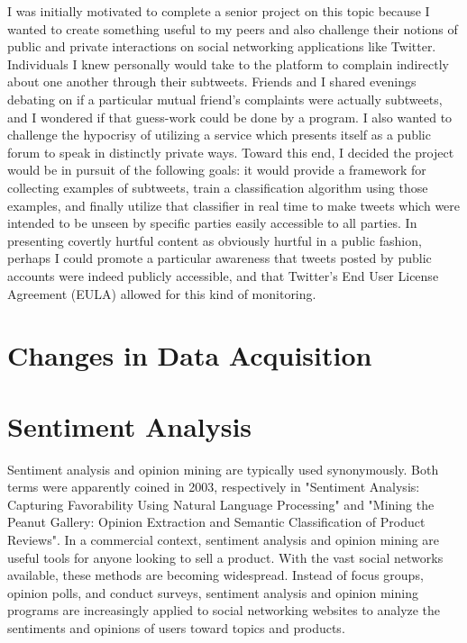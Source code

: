 \documentclass[11pt, twoside, reqno]{book}
\begin{document}
I was initially motivated to complete a senior project on this topic because I wanted to create something useful to my peers and also challenge their notions of public and private interactions on social networking applications like Twitter. Individuals I knew personally would take to the platform to complain indirectly about one another through their subtweets. Friends and I shared evenings debating on if a particular mutual friend's complaints were actually subtweets, and I wondered if that guess-work could be done by a program. I also wanted to challenge the hypocrisy of utilizing a service which presents itself as a public forum to speak in distinctly private ways. Toward this end, I decided the project would be in pursuit of the following goals: it would provide a framework for collecting examples of subtweets, train a classification algorithm using those examples, and finally utilize that classifier in real time to make tweets which were intended to be unseen by specific parties easily accessible to all parties. In presenting covertly hurtful content as obviously hurtful in a public fashion, perhaps I could promote a particular awareness that tweets posted by public accounts were indeed publicly accessible, and that Twitter's End User License Agreement (EULA) allowed for this kind of monitoring.

\section{Changes in Data Acquisition}
\label{changes_in_data}

\section{Sentiment Analysis}
\label{sentiment_analysis}

Sentiment analysis and opinion mining are typically used synonymously. Both terms were apparently coined in 2003, respectively in "Sentiment Analysis: Capturing Favorability Using Natural Language Processing"\cite{sentiment_origin} and "Mining the Peanut Gallery: Opinion Extraction and Semantic Classification of Product Reviews"\cite{opinion_origin}. In a commercial context, sentiment analysis and opinion mining are useful tools for anyone looking to sell a product. With the vast social networks available, these methods are becoming widespread. Instead of focus groups, opinion polls, and conduct surveys, sentiment analysis and opinion mining programs are increasingly applied to social networking websites to analyze the sentiments and opinions of users toward topics and products. 
\end{document}
